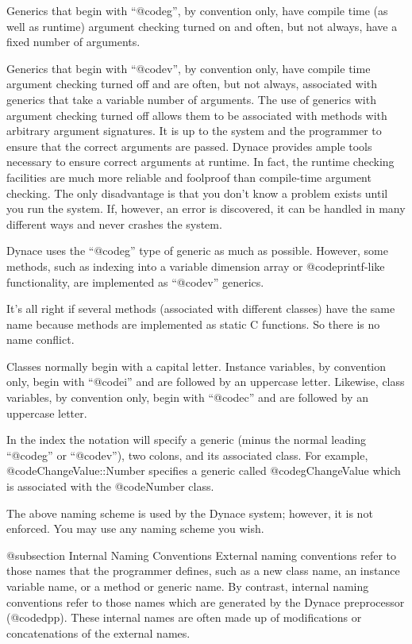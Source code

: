 Generics that begin with ``@code{g}'', by convention only, have compile
time (as well as runtime) argument checking turned on and often, but not
always, have a fixed number of arguments.

Generics that begin with ``@code{v}'', by convention only, have compile
time argument checking turned off and are often, but not always,
associated with generics that take a variable number of arguments.  The use
of generics with argument checking turned off allows them to be
associated with methods with arbitrary argument signatures.  It is up to
the system and the programmer to ensure that the correct arguments are
passed.  Dynace provides ample tools necessary to ensure correct
arguments at runtime.  In fact, the runtime checking facilities are much
more reliable and foolproof than compile-time argument checking.  The
only disadvantage is that you don't know a problem exists until you run
the system.  If, however, an error is discovered, it can be handled in many
different ways and never crashes the system.

Dynace uses the ``@code{g}'' type of generic as much as possible.
However, some methods, such as indexing into a variable dimension
array or @code{printf}-like functionality, are implemented as
``@code{v}'' generics.


It's all right if several methods (associated with different classes)
have the same name because methods are implemented as static C
functions.  So there is no name conflict.

Classes normally begin with a capital letter.  Instance variables, by
convention only, begin with ``@code{i}'' and are followed by an
uppercase letter.  Likewise, class variables, by convention only, begin
with ``@code{c}'' and are followed by an uppercase letter.

In the index the notation will specify a generic (minus the normal
leading ``@code{g}'' or ``@code{v}''), two colons, and its associated
class.  For example, @code{ChangeValue::Number} specifies a generic
called @code{gChangeValue} which is associated with the @code{Number}
class.

The above naming scheme is used by the Dynace system; however, it
is not enforced.  You may use any naming scheme you wish.

@subsection Internal Naming Conventions
External naming conventions refer to those names that the programmer
defines, such as a new class name, an instance variable name, or a method
or generic name.  By contrast, internal naming conventions refer to
those names which are generated by the Dynace preprocessor (@code{dpp}).
These internal names are often made up of modifications or
concatenations of the external names.

